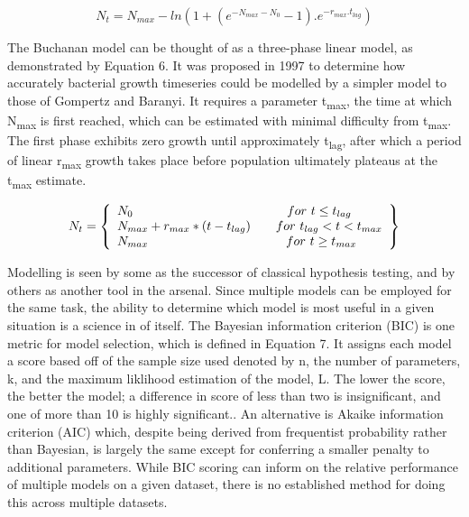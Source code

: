 \documentclass[11pt]{article}
\begin{document}
\begin{equation}
    N_{t} = N_{max} - ln{(1 + (e^{-N_{max} - N_{0}} - 1) . e^{-r_{max} . t_{lag}})}
\end{equation}
\vspace{3mm}



The Buchanan model can be thought of as a three-phase linear model, as demonstrated by Equation 6.\parencite{Buchanan1997} It was proposed in 1997 to determine how accurately bacterial growth timeseries could be modelled by a simpler model to those of Gompertz and Baranyi. It requires a parameter t\textsubscript{max}, the time at which N\textsubscript{max} is first reached, which can be estimated with minimal difficulty from t\textsubscript{max}. The first phase exhibits zero growth until approximately t\textsubscript{lag}, after which a period of linear r\textsubscript{max} growth takes place before population ultimately plateaus at the t\textsubscript{max} estimate.\parencite{Buchanan1997}

\begin{equation}
    N_{t} = \left\{
    \begin{array}{l}
        N_{0}                   \hspace{43mm}    for \           t \le t_{lag}\\
        N_{max} + r_{max} * (t - t_{lag}) \qquad for \ t_{lag} < t  <  t_{max}\\
        N_{max}                 \hspace{38.5mm}  for \           t \ge t_{max}\\
    \end{array}\right\}
\end{equation}
\vspace{5mm}



Modelling is seen by some as the successor of classical hypothesis testing, and by others as another tool in the arsenal.\parencite{Johnson2004} Since multiple models can be employed for the same task, the ability to determine which model is most useful in a given situation is a science in of itself. The Bayesian information criterion (BIC) is one metric for model selection, which is defined in Equation 7. It assigns each model a score based off of the sample size used denoted by n, the number of parameters, k, and the maximum liklihood estimation of the model, L.\parencite{Akaike1974} The lower the score, the better the model; a difference in score of less than two is insignificant, and one of more than 10 is highly significant.\parencite{Vrieze2012,Posada2004}. An alternative is Akaike information criterion (AIC) which, despite being derived from frequentist probability rather than Bayesian, is largely the same except for conferring a smaller penalty to additional parameters.\parencite{Posada2004} While BIC scoring can inform on the relative performance of multiple models on a given dataset, there is no established method for doing this across multiple datasets.
\end{document}
